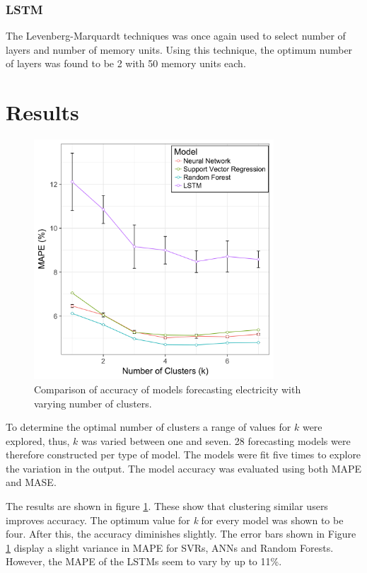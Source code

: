 \subsubsection{LSTM}

The Levenberg-Marquardt techniques was once again used to select number of layers and number of memory units. Using this technique, the optimum number of layers was found to be 2 with 50 memory units each.

\section{Results}
\begin{figure}
	\includegraphics[width=0.8\textwidth]{Chapter5/figures/results.png}
	\caption{Comparison of accuracy of models forecasting electricity with varying number of clusters.}
	\label{fig:results}
\end{figure}
To determine the optimal number of clusters a range of values for $k$ were explored, thus, $k$ was varied between one and seven. 28 forecasting models were therefore constructed per type of model. The models were fit five times to explore the variation in the output. The model accuracy was evaluated using both MAPE and MASE.

The results are shown in figure \ref{fig:results}. These show that clustering similar users improves accuracy. The optimum value for \textit{k} for every model was shown to be four. After this, the accuracy diminishes slightly. The error bars shown in Figure \ref{fig:results} display a slight variance in MAPE for SVRs, ANNs and Random Forests. However, the MAPE of the LSTMs seem to vary by up to 11\%. 

